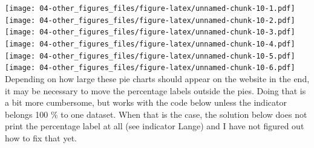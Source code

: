 \documentclass[
]{book}
\newenvironment{Shaded}{\begin{snugshade}}{\end{snugshade}}
\newcommand{\AttributeTok}[1]{\textcolor[rgb]{0.77,0.63,0.00}{#1}}
\newcommand{\ControlFlowTok}[1]{\textcolor[rgb]{0.13,0.29,0.53}{\textbf{#1}}}
\newcommand{\DecValTok}[1]{\textcolor[rgb]{0.00,0.00,0.81}{#1}}
\newcommand{\FloatTok}[1]{\textcolor[rgb]{0.00,0.00,0.81}{#1}}
\newcommand{\FunctionTok}[1]{\textcolor[rgb]{0.00,0.00,0.00}{#1}}
\newcommand{\NormalTok}[1]{#1}
\newcommand{\OtherTok}[1]{\textcolor[rgb]{0.56,0.35,0.01}{#1}}
\newcommand{\SpecialCharTok}[1]{\textcolor[rgb]{0.00,0.00,0.00}{#1}}
\newcommand{\StringTok}[1]{\textcolor[rgb]{0.31,0.60,0.02}{#1}}
\begin{document}
\begin{Shaded}
\end{Shaded}

\texttt{[image: 04-other\_figures\_files/figure-latex/unnamed-chunk-10-1.pdf]} \texttt{[image: 04-other\_figures\_files/figure-latex/unnamed-chunk-10-2.pdf]} \texttt{[image: 04-other\_figures\_files/figure-latex/unnamed-chunk-10-3.pdf]} \texttt{[image: 04-other\_figures\_files/figure-latex/unnamed-chunk-10-4.pdf]} \texttt{[image: 04-other\_figures\_files/figure-latex/unnamed-chunk-10-5.pdf]} \texttt{[image: 04-other\_figures\_files/figure-latex/unnamed-chunk-10-6.pdf]}
Depending on how large these pie charts should appear on the website in the end, it may be necessary to move the percentage labels outside the pies. Doing that is a bit more cumbersome, but works with the code below unless the indicator belongs 100 \% to one dataset. When that is the case, the solution below does not print the percentage label at all (see indicator Lange) and I have not figured out how to fix that yet.
\end{document}

